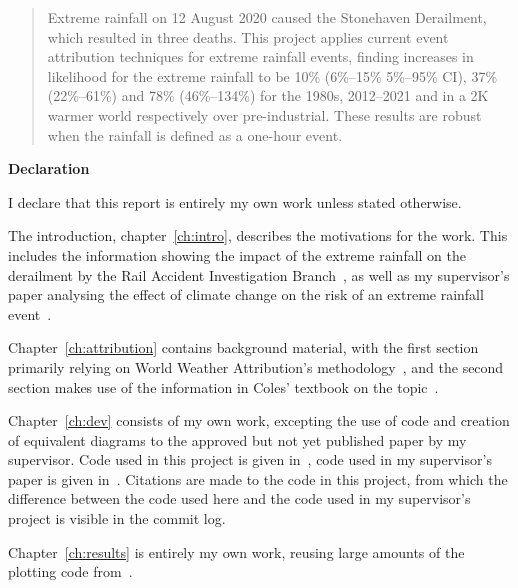 \documentclass[12pt,a4paper,openany]{report}
\begin{document}
\newpage



\begin{abstract}

Extreme rainfall on 12 August 2020 caused the Stonehaven Derailment,
    which resulted in three deaths.
This project applies current event attribution techniques for extreme rainfall events,
    finding increases in likelihood for the extreme rainfall to be 10\% (6\%--15\% 5\%--95\% CI),
    37\% (22\%--61\%) and 78\% (46\%--134\%) for the 1980s, 2012--2021 and in a 2K warmer world
    respectively over pre-industrial.
These results are robust when the rainfall is defined as a one-hour event.

\end{abstract}


\begin{center}
\textbf{Declaration}
\end{center}

I declare that this report is entirely my own work unless stated otherwise.

The introduction, chapter~\ref{ch:intro}, describes the motivations for the work.
This includes the information showing the impact of the extreme rainfall on the derailment by the Rail Accident Investigation Branch~\cite{RAIB_2022},
    as well as my supervisor's paper analysing the effect of climate change on the risk of an extreme rainfall event~\cite{Tett_Soon}.

Chapter~\ref{ch:attribution} contains background material,
    with the first section primarily relying on World Weather Attribution's methodology~\cite{van_Oldenborgh_et_al_2021},
    and the second section makes use of the information in Coles' textbook on the topic~\cite{Coles_2001}.

Chapter~\ref{ch:dev} consists of my own work,
    excepting the use of code and creation of equivalent diagrams to the approved but not yet published paper by my supervisor.
Code used in this project is given in~\cite{Me_Code},
    code used in my supervisor's paper is given in~\cite{Tett_Code}.
Citations are made to the code in this project,
    from which the difference between the code used here and the code used in my supervisor's project is visible in the commit log.

Chapter~\ref{ch:results} is entirely my own work,
    reusing large amounts of the plotting code from~\cite{Tett_Soon}.
\end{document}

